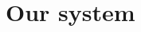 \documentclass{book}
\renewcommand{\(}{\begin{columns}}
\renewcommand{\)}{\end{columns}}
\newcommand{\<}[1]{\begin{column}{#1}}
\renewcommand{\>}{\end{column}}
\begin{document}


\chapter{Our system}
\end{document}
